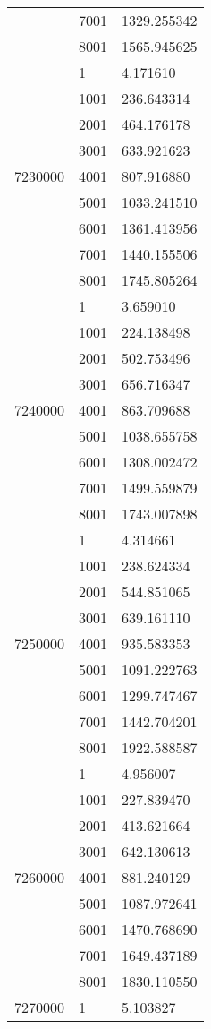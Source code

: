 \begin{table}[htb!]
\begin{tabular}{lll}
 & 7001 & 1329.255342 \\
 & 8001 & 1565.945625 \\
\multirow[c]{9}{*}{7230000} & 1 & 4.171610 \\
 & 1001 & 236.643314 \\
 & 2001 & 464.176178 \\
 & 3001 & 633.921623 \\
 & 4001 & 807.916880 \\
 & 5001 & 1033.241510 \\
 & 6001 & 1361.413956 \\
 & 7001 & 1440.155506 \\
 & 8001 & 1745.805264 \\
\multirow[c]{9}{*}{7240000} & 1 & 3.659010 \\
 & 1001 & 224.138498 \\
 & 2001 & 502.753496 \\
 & 3001 & 656.716347 \\
 & 4001 & 863.709688 \\
 & 5001 & 1038.655758 \\
 & 6001 & 1308.002472 \\
 & 7001 & 1499.559879 \\
 & 8001 & 1743.007898 \\
\multirow[c]{9}{*}{7250000} & 1 & 4.314661 \\
 & 1001 & 238.624334 \\
 & 2001 & 544.851065 \\
 & 3001 & 639.161110 \\
 & 4001 & 935.583353 \\
 & 5001 & 1091.222763 \\
 & 6001 & 1299.747467 \\
 & 7001 & 1442.704201 \\
 & 8001 & 1922.588587 \\
\multirow[c]{9}{*}{7260000} & 1 & 4.956007 \\
 & 1001 & 227.839470 \\
 & 2001 & 413.621664 \\
 & 3001 & 642.130613 \\
 & 4001 & 881.240129 \\
 & 5001 & 1087.972641 \\
 & 6001 & 1470.768690 \\
 & 7001 & 1649.437189 \\
 & 8001 & 1830.110550 \\
\multirow[c]{9}{*}{7270000} & 1 & 5.103827 \\

\end{tabular}
\end{table}
